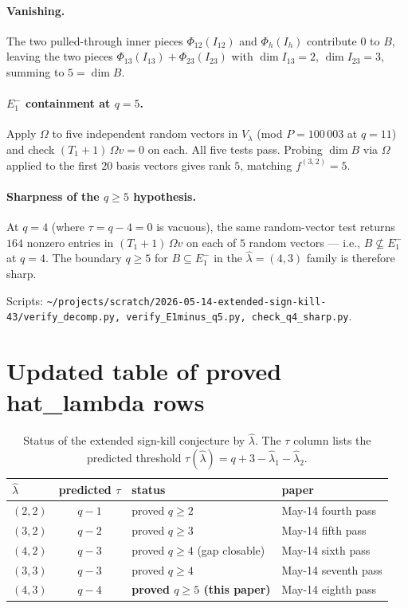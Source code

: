 \documentclass[11pt]{article}
\theoremstyle{definition}
\newcommand{\Om}{\Omega}
\newcommand{\hatl}{\widehat\lambda}
\begin{document}
\paragraph{Vanishing.}  The two pulled-through inner pieces
$\Phi_{12}(I_{12})$ and $\Phi_h(I_h)$ contribute $0$ to $B$, leaving
the two pieces $\Phi_{13}(I_{13}) + \Phi_{23}(I_{23})$ with
$\dim I_{13} = 2$, $\dim I_{23} = 3$, summing to $5 = \dim B$.

\paragraph{$E_1^-$ containment at $q = 5$.}  Apply $\Om$ to five
independent random vectors in $V_\lambda$ (mod $P = 100\,003$ at $q = 11$)
and check $(T_1+1)\,\Om v = 0$ on each.  All five tests pass.  Probing
$\dim B$ via $\Om$ applied to the first $20$ basis vectors gives
rank $5$, matching $f^{(3,2)} = 5$.

\paragraph{Sharpness of the $q \ge 5$ hypothesis.}  At $q = 4$
(where $\tau = q - 4 = 0$ is vacuous), the same random-vector test
returns $164$ nonzero entries in $(T_1+1)\,\Om v$ on each of $5$
random vectors --- i.e., $B \not\subseteq E_1^-$ at $q = 4$.  The
boundary $q \ge 5$ for $B \subseteq E_1^-$ in the $\hatl = (4, 3)$
family is therefore sharp.

Scripts:
\texttt{\textasciitilde/projects/scratch/2026-05-14-extended-sign-kill-43/verify\_decomp.py,
verify\_E1minus\_q5.py, check\_q4\_sharp.py}.

\section{Updated table of proved hat\_lambda rows}\label{sec:table}

\begin{table}[h]
\centering
\renewcommand{\arraystretch}{1.15}
\caption{Status of the extended sign-kill conjecture by $\hatl$.  The
$\tau$ column lists the predicted threshold $\tau(\hatl) = q + 3 -
\hatl_1 - \hatl_2$.}
\begin{tabular}{l|c|l|l}
\toprule
$\hatl$ & predicted $\tau$ & status & paper \\
\midrule
$(2, 2)$ & $q - 1$ & proved $q \ge 2$           & May-14 fourth pass \\
$(3, 2)$ & $q - 2$ & proved $q \ge 3$           & May-14 fifth pass \\
$(4, 2)$ & $q - 3$ & proved $q \ge 4$ (gap closable) & May-14 sixth pass \\
$(3, 3)$ & $q - 3$ & proved $q \ge 4$           & May-14 seventh pass \\
$(4, 3)$ & $q - 4$ & \textbf{proved $q \ge 5$ (this paper)} & May-14 eighth pass \\
\bottomrule
\end{tabular}
\end{table}
\end{document}
